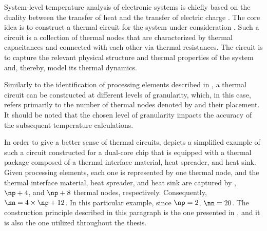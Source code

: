 System-level temperature analysis of electronic systems is chiefly based on the
duality between the transfer of heat and the transfer of electric charge
\cite{kreith2000}. The core idea is to construct a thermal  circuit for
the system under consideration \cite{skadron2003}. Such a circuit is a
collection of thermal nodes that are characterized by thermal capacitances and
connected with each other via thermal resistances. The circuit is to capture the
relevant physical structure and thermal properties of the system and, thereby,
model its thermal dynamics.

Similarly to the identification of processing elements described in
, a thermal  circuit can be constructed at different
levels of granularity, which, in this case, refers primarily to the number of
thermal nodes denoted by \nn and their placement. It should be noted that the
chosen level of granularity impacts the accuracy of the subsequent temperature
calculations.

In order to give a better sense of thermal  circuits,
 depicts a simplified example of such a circuit
constructed for a dual-core chip that is equipped with a thermal package
composed of a thermal interface material, heat spreader, and heat sink. Given
\np processing elements, each one is represented by one thermal node, and the
thermal interface material, heat spreader, and heat sink are captured by \np,
$\np + 4$, and $\np + 8$ thermal nodes, respectively. Consequently, $\nn = 4
\times \np + 12$. In this particular example, since $\np = 2$, $\nn = 20$. The
construction principle described in this paragraph is the one presented in
\cite{huang2008}, and it is also the one utilized throughout the thesis.

